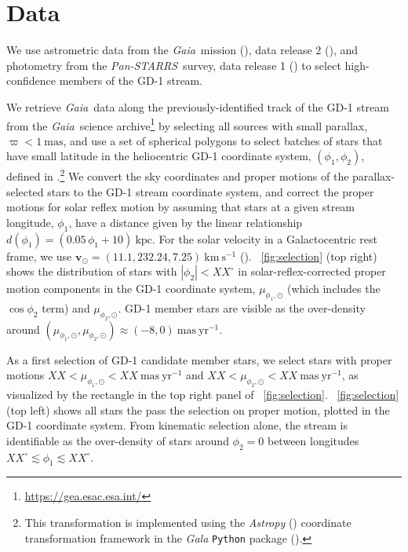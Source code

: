 \documentclass[modern]{aastex62}
\newcommand{\package}[1]{\textsl{#1}}
\newcommand{\gaia}{\textsl{Gaia}}
\newcommand{\pans}{\textsl{Pan-STARRS}}
\newcommand{\kms}{\ensuremath{\textrm{km}~\textrm{s}^{-1}}}
\newcommand{\bs}[1]{\boldsymbol{#1}}
\newcommand{\masyr}{\ensuremath{\textrm{mas}~\textrm{yr}^{-1}}}
\begin{document}
\section{Data}
\label{sec:data}

We use astrometric data from the \gaia\ mission (\citealt{Prusti:2016}), data
release 2 (\citealt{Gaia-Collaboration:2018, Lindegren:2018}), and photometry
from the \pans\ survey, data release 1 (\citealt{Chambers:2016}) to select
high-confidence members of the GD-1 stream.

We retrieve \gaia\ data along the previously-identified track of the GD-1 stream
from the \gaia\ science archive\footnote{\url{https://gea.esac.esa.int/}} by
selecting all sources with small parallax, $\varpi < 1~\textrm{mas}$, and use a
set of spherical polygons to select batches of stars that have small latitude in
the heliocentric GD-1 coordinate system, $(\phi_1, \phi_2)$, defined in
\cite{Koposov:2010}.\footnote{This transformation is implemented using the
\package{Astropy} (\citealt{astropy}) coordinate transformation framework in the
\package{Gala} \texttt{Python} package (\citealt{gala}).}
We convert the sky coordinates and proper motions of the parallax-selected stars
to the GD-1 stream coordinate system, and correct the proper motions for solar
reflex motion by assuming that stars at a given stream longitude, $\phi_1$, have
a distance given by the linear relationship $d(\phi_1) = (0.05 \, \phi_1 +
10)~\textrm{kpc}$.
For the solar velocity in a Galactocentric rest frame, we use $\bs{v}_\odot =
(11.1, 232.24, 7.25)~\kms$ (\citealt{Schonrich:2010, Bovy:2015}).
\figurename~\ref{fig:selection} (top right) shows the distribution of stars with
$|\phi_2| < XX^\circ$ in solar-reflex-corrected proper motion components in the
GD-1 coordinate system, $\mu_{\phi_1, \odot}$ (which includes the $\cos{\phi_2}$
term) and $\mu_{\phi_2, \odot}$.
GD-1 member stars are visible as the over-density around
$(\mu_{\phi_1, \odot}, \mu_{\phi_2, \odot}) \approx (-8, 0)~\masyr$.

As a first selection of GD-1 candidate member stars, we select stars with proper
motions $XX < \mu_{\phi_1, \odot} < XX~\masyr$ and $XX < \mu_{\phi_2, \odot} <
XX~\masyr$, as visualized by the rectangle in the top right panel of
\figurename~\ref{fig:selection}.
\figurename~\ref{fig:selection} (top left) shows all stars the pass the
selection on proper motion, plotted in the GD-1 coordinate system.
From kinematic selection alone, the stream is identifiable as the over-density
of stars around $\phi_2 = 0$ between longitudes $XX^\circ \lesssim \phi_1
\lesssim XX^\circ$.
\end{document}
